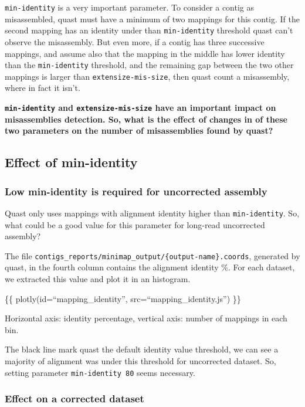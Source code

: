 \documentclass[./main.tex]{subfiles}
\begin{document}
\texttt{min-identity} is a very important parameter. To consider a
contig as misassembled, quast must have a minimum of two mappings for
this contig. If the second mapping has an identity under than
\texttt{min-identity} threshold quast can't observe the misassembly. But
even more, if a contig has three successive mappings, and assume also
that the mapping in the middle has lower identity than the
\texttt{min-identity} threshold, and the remaining gap between the two
other mappings is larger than \texttt{extensize-mis-size}, then quast
count a misassembly, where in fact it isn't.

\textbf{\texttt{min-identity} and \texttt{extensize-mis-size} have an
important impact on misassemblies detection. So, what is the effect of
changes in of these two parameters on the number of misassemblies found
by quast?}

\subsection{Effect of min-identity}\label{effect-of-min-identity}

\subsubsection{Low min-identity is required for uncorrected assembly} \label{low-min-identity-is-required-for-uncorrected-assembly}

Quast only uses mappings with alignment identity higher than
\texttt{min-identity}. So, what could be a good value for this parameter
for long-read uncorrected assembly?

The file
\texttt{contigs\_reports/minimap\_output/\{output-name\}.coords},
generated by quast, in the fourth column contains the alignment identity
\%. For each dataset, we extracted this value and plot it in an
histogram.

\{\{ plotly(id=``mapping\_identity'', src=``mapping\_identity.js'') \}\}

Horizontal axis: identity percentage, vertical axis: number of mappings
in each bin.

The black line mark quast the default identity value threshold, we can
see a majority of alignment was under this threshold for uncorrected
dataset. So, setting parameter \texttt{min-identity\ 80} seems
necessary.

\subsubsection{Effect on a corrected dataset} \label{effect-on-a-corrected-dataset}
\end{document}
